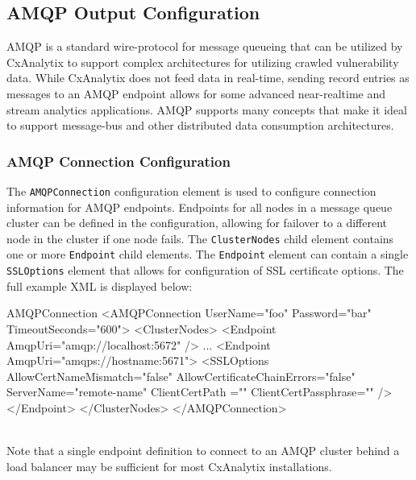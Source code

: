 \subsection{AMQP Output Configuration}\label{sec:amqp_config}

AMQP is a standard wire-protocol for message queueing that can be utilized by CxAnalytix to support complex architectures for utilizing crawled 
vulnerability data.  While CxAnalytix does not feed data in real-time, sending record entries as messages to an AMQP endpoint allows for some
advanced near-realtime and stream analytics applications.  AMQP supports many concepts that make it ideal to support message-bus and other
distributed data consumption architectures.




\subsubsection{AMQP Connection Configuration}

The \texttt{AMQPConnection} configuration element is used to configure connection information for AMQP endpoints.  Endpoints for all nodes in a message queue cluster
can be defined in the configuration, allowing for failover to a different node in the cluster if one node fails.  The \texttt{ClusterNodes} child element
contains one or more \texttt{Endpoint} child elements.  The \texttt{Endpoint} element can contain a single \texttt{SSLOptions} element that allows
for configuration of SSL certificate options.  The full example XML is displayed below:\\


\begin{xml}{AMQPConnection}{\expandsenv\encrypts}{}
<AMQPConnection UserName="foo" Password="bar" TimeoutSeconds="600">
    <ClusterNodes>
        <Endpoint 
            AmqpUri="amqp://localhost:5672" 
            />
        ...
        <Endpoint 
            AmqpUri="amqps://hostname:5671">
            <SSLOptions 
                AllowCertNameMismatch="false" 
                AllowCertificateChainErrors="false" 
                ServerName="remote-name" 
                ClientCertPath ="" 
                ClientCertPassphrase=""
                />
        </Endpoint>
    </ClusterNodes>
</AMQPConnection>
\end{xml}

\noindent\\Note that a single endpoint definition to connect to an AMQP cluster behind a load balancer may be sufficient for most CxAnalytix installations.

